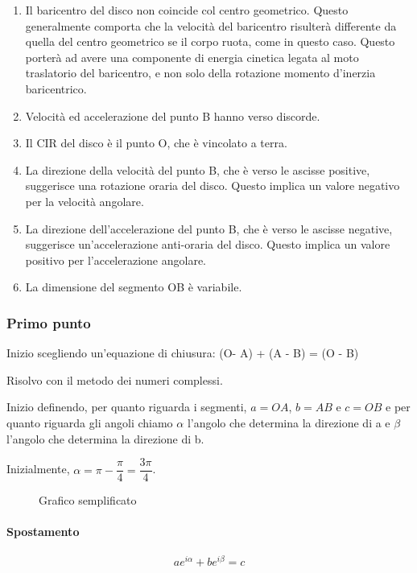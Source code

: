 \documentclass[main.tex]{subfiles}
\begin{document}
\begin{enumerate}
	\item Il baricentro del disco non coincide col centro geometrico. Questo generalmente comporta che la velocità del baricentro risulterà differente da quella del centro geometrico se il corpo ruota, come in questo caso. Questo porterà ad avere una componente di energia cinetica legata al moto traslatorio del baricentro, e non solo della rotazione momento d'inerzia baricentrico.
	\item Velocità ed accelerazione del punto B hanno verso discorde.
	\item Il CIR del disco è il punto O, che è vincolato a terra.
	\item La direzione della velocità del punto B, che è verso le ascisse positive, suggerisce una rotazione oraria del disco. Questo implica un valore negativo per la velocità angolare.
	\item La direzione dell'accelerazione del punto B, che è verso le ascisse negative, suggerisce un'accelerazione anti-oraria del disco. Questo implica un valore positivo per l'accelerazione angolare.
	\item La dimensione del segmento OB è variabile.
\end{enumerate}

\subsubsection{Primo punto}
Inizio scegliendo un'equazione di chiusura: (O-  A) + (A - B) = (O - B)

Risolvo con il metodo dei numeri complessi.

Inizio definendo, per quanto riguarda i segmenti, $a = OA$, $b = AB$ e $c = OB$ e per quanto riguarda gli angoli chiamo $\alpha$ l'angolo che determina la direzione di a e $\beta$ l'angolo che determina la direzione di b.

Inizialmente, $\alpha = \pi - \dfrac{\pi}{4} = \dfrac{3\pi}{4}$.

\begin{figure}[H]
\centering
\resizebox{.75\textwidth}{!}{}
\caption{Grafico semplificato}
\end{figure}

\paragraph{Spostamento}

\[
	ae^{i\alpha} + be^{i\beta} = c
\]
\end{document}
